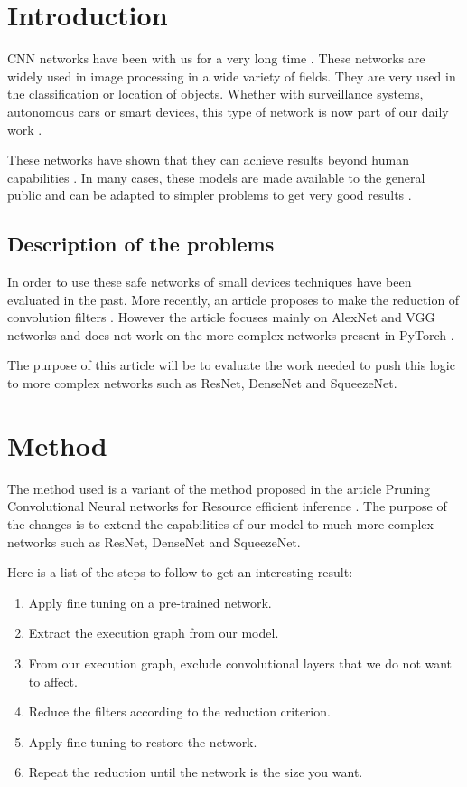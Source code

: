 \documentclass[12pt]{article}
\begin{document}
\section*{Introduction}

CNN networks have been with us for a very long time \cite{lecunn1}. These networks are widely used in image processing in a wide variety of fields. They are very used in the classification or location of objects. Whether with surveillance systems, autonomous cars or smart devices, this type of network is now part of our daily work \cite{daily}.

These networks have shown that they can achieve results beyond human capabilities \cite{beathuman}. In many cases, these models are made available to the general public and can be adapted to simpler problems to get very good results \cite{transfer}.

\subsection{Description of the problems}
In order to use these safe networks of small devices \cite{han1} techniques have been evaluated in the past. More recently, an article proposes to make the reduction of convolution filters \cite{molchanov}. However the article focuses mainly on AlexNet and VGG networks and does not work on the more complex networks present in PyTorch \cite{pytorchmodel}.

The purpose of this article will be to evaluate the work needed to push this logic to more complex networks such as ResNet, DenseNet and SqueezeNet.

\section*{Method}
\setcounter{subsection}{0}
The method used is a variant of the method proposed in the article Pruning Convolutional Neural networks for Resource efficient inference \cite{molchanov}. The purpose of the changes is to extend the capabilities of our model to much more complex networks such as ResNet, DenseNet and SqueezeNet.

Here is a list of the steps to follow to get an interesting result:
\begin{enumerate}
	\item Apply fine tuning on a pre-trained network.
	\item Extract the execution graph from our model.
	\item From our execution graph, exclude convolutional layers that we do not want to affect.
	\item Reduce the filters according to the reduction criterion.
	\item Apply fine tuning to restore the network.
	\item Repeat the reduction until the network is the size you want.
\end{enumerate}
\end{document}
